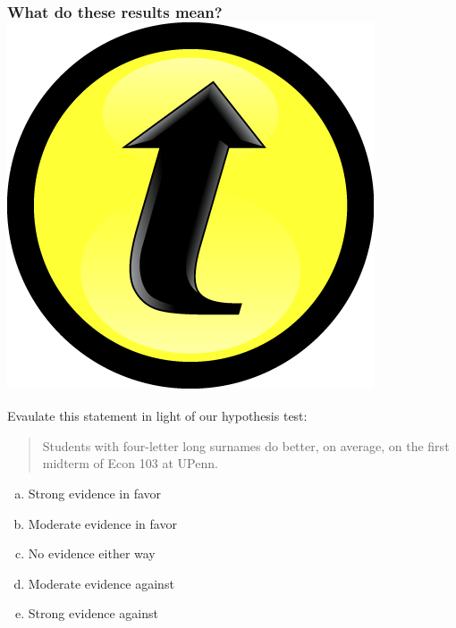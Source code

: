 \documentclass[handout]{beamer}
\begin{document}
\begin{frame}[c]\frametitle{What do these results mean? \hfill \includegraphics[scale = 0.05]{./images/clicker}}

Evaulate this statement in light of our hypothesis test:
\vspace{1em}

\begin{quote}
	Students with four-letter long surnames do better, on average, on the first midterm of Econ 103 at UPenn.
\end{quote}

\begin{enumerate}[(a)]
	\item Strong evidence in favor
	\item Moderate evidence in favor
	\item No evidence either way
	\item Moderate evidence against
	\item Strong evidence against
\end{enumerate}
\end{frame}
\end{document}
